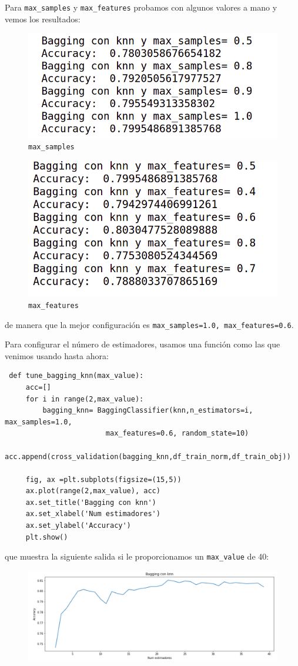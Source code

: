 \documentclass[a4paper,11pt]{article}
\begin{document}
 Para \texttt{max_samples} y \texttt{max_features} probamos con algunos valores a mano y vemos los resultados: 
 
 \begin{figure}[H]
 	\centering
 	\includegraphics[width=0.5\linewidth]{img/bagging1}
 	\caption{\texttt{max_samples}  }
 	\label{fig:bagging1}
 \end{figure}
 
 \begin{figure}[H]
 	\centering
 	\includegraphics[width=0.5\linewidth]{img/bagging2}
 	\caption{\texttt{max_features}}
 	\label{fig:bagging2}
 \end{figure}
 
 de manera que la mejor configuración es \texttt{max_samples=1.0, max_features=0.6}.
 
 Para configurar el número de estimadores, usamos una función como las que venimos usando hasta ahora:
 
 \begin{verbatim}
 def tune_bagging_knn(max_value):
	 acc=[]
	 for i in range(2,max_value):
		 bagging_knn= BaggingClassifier(knn,n_estimators=i, max_samples=1.0,
		 				max_features=0.6, random_state=10)
		 acc.append(cross_validation(bagging_knn,df_train_norm,df_train_obj))
	 
	 fig, ax =plt.subplots(figsize=(15,5))
	 ax.plot(range(2,max_value), acc)
	 ax.set_title('Bagging con knn')
	 ax.set_xlabel('Num estimadores')
	 ax.set_ylabel('Accuracy')
	 plt.show()
 \end{verbatim}
 
 que muestra la siguiente salida si le proporcionamos un \texttt{max_value} de 40:
 
 \begin{figure}[H]
 	\centering
 	\includegraphics[width=0.8\linewidth]{img/bagging3}
 	\caption{}
 	\label{fig:bagging3}
 \end{figure}
 
\end{document}
